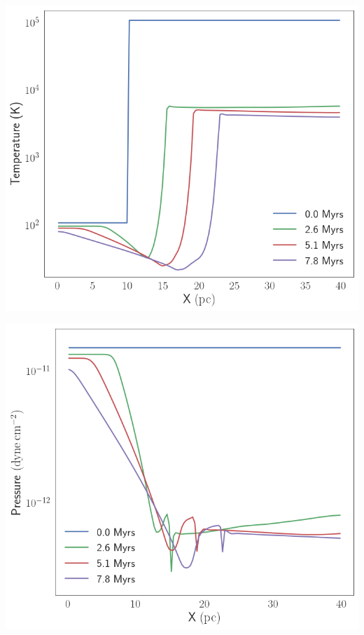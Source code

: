 	\begin{marginfigure}
	\centering
	\includegraphics[width=1\linewidth]{DataImages/H2CoolingTMPprofile}
	\caption{}
	\label{fig:h2coolingtmpprofile}
\end{marginfigure}

	\begin{marginfigure}
	\centering
	\includegraphics[width=1\linewidth]{DataImages/H2CoolingPRSprofile}
	\caption{}
	\label{fig:h2coolingprsprofile}
\end{marginfigure}



